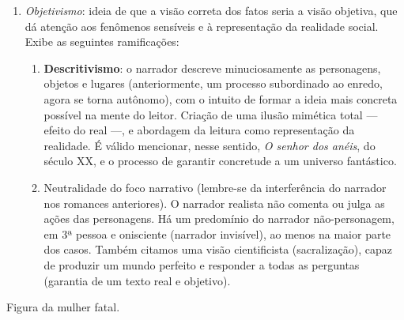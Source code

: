 \begin{enumerate}
\item \textit{Objetivismo}: ideia de que a visão correta dos fatos seria a visão objetiva, que dá atenção aos fenômenos sensíveis e à representação da realidade social. Exibe as seguintes ramificações:
\begin{enumerate}
\item \textbf{Descritivismo}: o narrador descreve minuciosamente as personagens, objetos e lugares (anteriormente, um processo subordinado ao enredo, agora se torna autônomo), com o intuito de formar a ideia mais concreta possível na mente do leitor. Criação de uma ilusão mimética total — efeito do real —, e abordagem da leitura como representação da realidade. É válido mencionar, nesse sentido, \textit{O senhor dos anéis}, do século XX, e o processo de garantir concretude a um universo fantástico.
\item Neutralidade do foco narrativo (lembre-se da interferência do narrador nos romances anteriores). O narrador realista não comenta ou julga as ações das personagens. Há um predomínio do narrador não-personagem, em 3ª pessoa e onisciente (narrador invisível), ao menos na maior parte dos casos. Também citamos uma visão cientificista (sacralização), capaz de produzir um mundo perfeito e responder a todas as perguntas (garantia de um texto real e objetivo).
\end{enumerate}
\end{enumerate}

\par Figura da mulher fatal. 